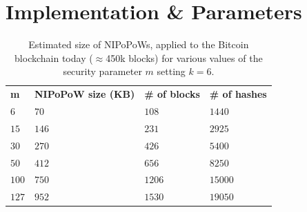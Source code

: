 \section{Implementation \& Parameters}

\begin{table}
  \caption{\label{table.size}
    Estimated size of NIPoPoWs, applied to the Bitcoin blockchain today ($\approx$450k blocks) for various values of the security parameter $m$
    setting $k = 6$.
  }
  \begin{tabular}{llll}
      {\bf m}  & {\bf NIPoPoW size (KB)} & {\bf \# of blocks} & {\bf
      \# of hashes}\\
      $6$   & $70$  & $108$ & $1440$  \\
      $15$  & $146$ & $231$ & $2925$  \\
      $30$  & $270$ & $426$ & $5400$  \\
      $50$  & $412$ & $656$ & $8250$ \\
      $100$ & $750$ & $1206$ & $15000$ \\
      $127$ & $952$ & $1530$ & $19050$ \\
  \end{tabular}
\end{table}



